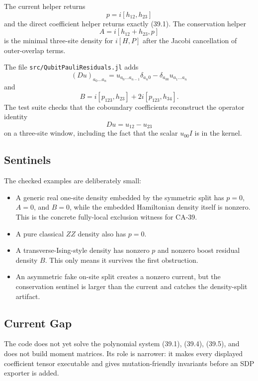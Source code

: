 The current helper returns
\[
  p=i[h_{12},h_{23}]
\]
and the direct coefficient helper returns exactly (39.1).  The conservation
helper
\[
  A=i[h_{12}+h_{23},p]
\]
is the minimal three-site density for \(i[H,P]\) after the Jacobi cancellation
of outer-overlap terms.

The file \texttt{src/QubitPauliResiduals.jl} adds
\[
  (D u)_{a_0\ldots a_n}
  =
  u_{a_0\ldots a_{n-1}}\delta_{a_n0}
  -
  \delta_{a_00}u_{a_1\ldots a_n}
\]
and
\[
  B=i[p_{123},h_{23}]+2i[p_{123},h_{34}].
\]
The test suite checks that the coboundary coefficients reconstruct the operator
identity
\[
  D u = u_{12}-u_{23}
\]
on a three-site window, including the fact that the scalar \(u_{00}I\) is in
the kernel.

\subsection{Sentinels}

The checked examples are deliberately small:

\begin{itemize}
\item A generic real one-site density embedded by the symmetric split has
  \(p=0\), \(A=0\), and \(B=0\), while the embedded Hamiltonian density itself
  is nonzero.  This is the concrete fully-local exclusion witness for CA-39.
\item A pure classical \(ZZ\) density also has \(p=0\).
\item A transverse-Ising-style density has nonzero \(p\) and nonzero boost
  residual density \(B\).  This only means it survives the first obstruction.
\item An asymmetric fake on-site split creates a nonzero current, but the
  conservation sentinel is larger than the current and catches the density-split
  artifact.
\end{itemize}

\subsection{Current Gap}

The code does not yet solve the polynomial system (39.1), (39.4), (39.5), and
does not build moment matrices.  Its role is narrower: it makes every displayed
coefficient tensor executable and gives mutation-friendly invariants before an
SDP exporter is added.

